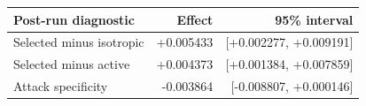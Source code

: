 \begin{tabular}{lrr}
\toprule
Post-run diagnostic & Effect & 95\% interval \\
\midrule
Selected minus isotropic & +0.005433 & [+0.002277, +0.009191] \\
Selected minus active & +0.004373 & [+0.001384, +0.007859] \\
Attack specificity & -0.003864 & [-0.008807, +0.000146] \\
\bottomrule
\end{tabular}
